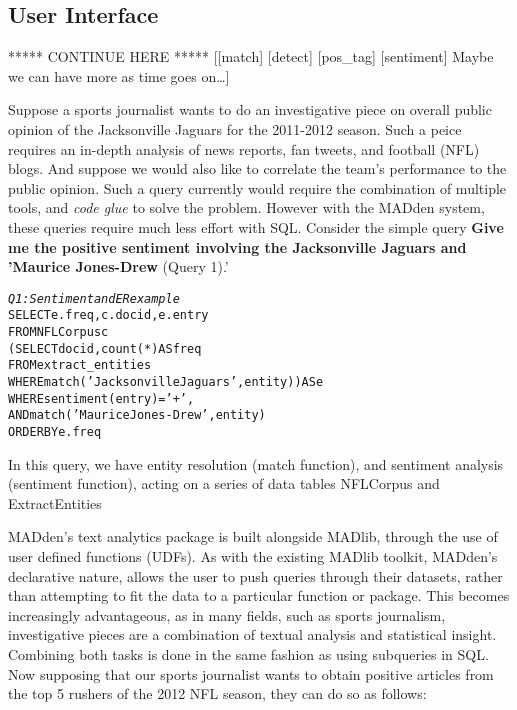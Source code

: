\subsection{User Interface}




***** CONTINUE HERE *****
[[match]
 [detect]
 [pos_tag]
 [sentiment]
 Maybe we can have more as time goes on\ldots]


Suppose a sports journalist wants to do an investigative
piece on overall public opinion of the Jacksonville Jaguars
for the 2011-2012 season. Such a peice requires an in-depth analysis of news
reports, fan tweets, and football (NFL) blogs. And suppose we would also like 
to correlate the team's performance to the public opinion. Such a query
currently would require the combination of multiple tools, and \textit{code glue}
to solve the problem. However with the MADden system, these queries require much
less effort with SQL. Consider the simple query \textbf{Give me the positive
sentiment involving the Jacksonville Jaguars and 'Maurice Jones-Drew} (Query 1).' 

\begin{small}
\begin{alltt}
\textit{Q1: Sentiment and ER example }
SELECT e.freq, c.docid,  e.entry
FROM NFLCorpus c
    (SELECT docid, count(*) AS freq
    FROM extract_entities
    WHERE match('Jacksonville Jaguars', entity)) AS e
WHERE sentiment(entry) = '+',
AND match('Maurice Jones-Drew', entity)
ORDER BY e.freq
\end{alltt}
\end{small}
\label{}

In this query, we have entity resolution (match function), and sentiment
analysis (sentiment function), acting on a series of data tables NFLCorpus and
ExtractEntities 

MADden's text analytics package is built alongside MADlib, through the use of
user defined functions (UDFs). As with the existing MADlib toolkit, MADden's 
declarative nature, allows the user to push queries through their datasets,
rather than attempting to fit the data to a particular function or package.
This becomes increasingly advantageous, as in many fields, such as sports
journalism, investigative pieces are a combination of textual analysis and
statistical insight. Combining both tasks is done in the same fashion as
using subqueries in SQL. Now supposing that our sports journalist wants
to obtain positive articles from the top 5 rushers of the 2012 NFL season,
they can do so as follows:

